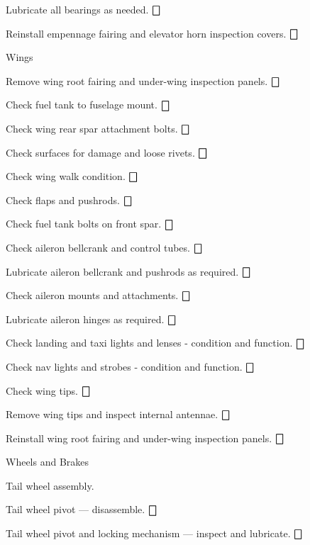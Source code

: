 \begin{enumerate*}
\begin{enumerate*}
		\item Lubricate all bearings as needed. \dotfill $\bigbox$
		\item Reinstall empennage fairing and elevator horn inspection covers. \dotfill $\bigbox$
	\end{enumerate*}
	\item{Wings} 
	\begin{enumerate*}
		\item Remove wing root fairing and under-wing inspection panels. \dotfill $\bigbox$
		\item Check fuel tank to fuselage mount. \dotfill $\bigbox$
		\item Check wing rear spar attachment bolts. \dotfill $\bigbox$
		\item Check surfaces for damage and loose rivets. \dotfill $\bigbox$
		\item Check wing walk condition. \dotfill $\bigbox$
		\item Check flaps and pushrods. \dotfill $\bigbox$
		\item Check fuel tank bolts on front spar. \dotfill $\bigbox$
		\item Check aileron bellcrank and control tubes. \dotfill $\bigbox$
		\item Lubricate aileron bellcrank and pushrods as required. \dotfill $\bigbox$
		\item Check aileron mounts and attachments. \dotfill $\bigbox$
		\item Lubricate aileron hinges as required. \dotfill $\bigbox$
		\item Check landing and taxi lights and lenses - condition and function. \dotfill $\bigbox$
		\item Check nav lights and strobes - condition and function. \dotfill $\bigbox$
		\item Check wing tips. \dotfill $\bigbox$
		\item Remove wing tips and inspect internal antennae. \dotfill $\bigbox$
		\item Reinstall wing root fairing and under-wing inspection panels. \dotfill $\bigbox$
	\end{enumerate*}
	\item{Wheels and Brakes} 
	\begin{enumerate*}
		\item Tail wheel assembly. 
		\begin{enumerate*}
		  \item Tail wheel pivot --- disassemble. \dotfill $\bigbox$
		  \item Tail wheel pivot and locking mechanism --- inspect and lubricate. \dotfill $\bigbox$

\end{enumerate*}
\end{enumerate*}
\end{enumerate*}

